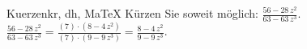 \begin{MAufgabe}{Kuerzen}{kr, dh, MaTeX}
K\"urzen Sie soweit m\"oglich: $\frac{56 - 28\, z^2}{63 - 63\, z^3}$.\\ 
\ifLsg\MLoesung
\quad $\frac{56 - 28\, z^2}{63 - 63\, z^3}=\frac{(7)\cdot(8 - 4\, z^2)}{(7)\cdot(9 - 9\, z^3)}=\frac{8 - 4\, z^2}{9 - 9\, z^3}$.\else\relax\fi
 \end{MAufgabe}